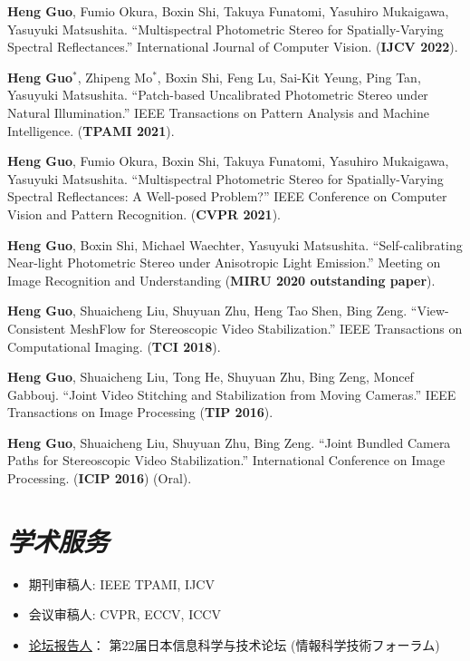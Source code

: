 \documentclass[UTF8]{ctexart}
\begin{document}
\begin{enumerate}[label={[\arabic*]}]
		\item \textbf{Heng Guo}, Fumio Okura, Boxin Shi, Takuya Funatomi, Yasuhiro Mukaigawa, Yasuyuki Matsushita. ``Multispectral Photometric Stereo for Spatially-Varying Spectral Reflectances.'' International Journal of Computer Vision. (\textbf{IJCV 2022}). 
		\item \textbf{Heng Guo$^*$}, Zhipeng Mo$^*$, Boxin Shi, Feng Lu, Sai-Kit Yeung, Ping Tan, Yasuyuki Matsushita. ``Patch-based Uncalibrated Photometric Stereo under Natural Illumination.'' 
		IEEE Transactions on Pattern Analysis and Machine Intelligence. (\textbf{TPAMI 2021}). 
		\item \textbf{Heng Guo}, Fumio Okura, Boxin Shi, Takuya Funatomi, Yasuhiro Mukaigawa, Yasuyuki Matsushita. ``Multispectral Photometric Stereo for Spatially-Varying Spectral Reflectances: A Well-posed Problem?'' IEEE Conference on Computer Vision and Pattern Recognition. (\textbf{CVPR 2021}). 
		\item \textbf{Heng Guo}, Boxin Shi, Michael Waechter, Yasuyuki Matsushita. ``Self-calibrating Near-light Photometric Stereo under Anisotropic Light Emission.'' Meeting on Image Recognition and Understanding (\textbf{MIRU 2020 outstanding paper}).  
		\item \textbf{Heng Guo}, Shuaicheng Liu, Shuyuan Zhu, Heng Tao Shen, Bing Zeng. ``View-Consistent MeshFlow for Stereoscopic Video Stabilization.'' IEEE Transactions on Computational Imaging. (\textbf{TCI 2018}).
		\item \textbf{Heng Guo}, Shuaicheng Liu, Tong He, Shuyuan Zhu, Bing Zeng, Moncef Gabbouj. ``Joint Video Stitching and Stabilization from Moving Cameras.'' IEEE Transactions on Image Processing (\textbf{TIP 2016}).
		\item \textbf{Heng Guo}, Shuaicheng Liu, Shuyuan Zhu, Bing Zeng. ``Joint Bundled Camera Paths for Stereoscopic Video Stabilization.'' International Conference on Image Processing. (\textbf{ICIP 2016}) (Oral).

	\end{enumerate}
	
	

	
	
	\section{\textit{\textbf{学术服务}}}
	\begin{itemize}
		\item 期刊审稿人: IEEE TPAMI, IJCV
		\item 会议审稿人: CVPR, ECCV, ICCV
		\item \href{https://gakkai-web.net/fit/program_web/event_TCS4-2.html}{\underline{论坛报告人}}： 第22届日本信息科学与技术论坛 (情報科学技術フォーラム) 
	\end{itemize}
\end{document}
